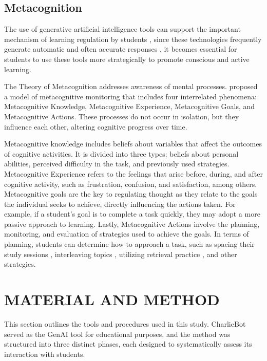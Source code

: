 \documentclass[a4paper,twoside]{article}
\begin{document}
\subsection{Metacognition}

The use of generative artificial intelligence tools can support the important
mechanism of learning regulation by students \citep{larsen18}, since these
technologies frequently generate automatic and often accurate responses
\cite{Puryear22}, it becomes essential for students to use these tools more
strategically to promote conscious and active learning.

The Theory of Metacognition addresses awareness of mental processes.
\cite{flavell79} proposed a model of metacognitive monitoring that includes four
interrelated phenomena: Metacognitive Knowledge, Metacognitive Experience,
 Metacognitive Goals, and Metacognitive Actions. These processes do not occur
in isolation, but they influence each other, altering cognitive progress over
time.

Metacognitive knowledge includes beliefs about variables that affect the
outcomes of cognitive activities. It is divided into three types: beliefs about
personal abilities, perceived difficulty in the task, and previously used
strategies. Metacognitive Experience refers to the feelings that arise
before, during, and after cognitive activity, such as frustration, confusion,
and satisfaction, among others. Metacognitive goals are the key to regulating
thought as they relate to the goals the individual seeks to achieve, directly
influencing the actions taken. For example, if a student’s goal is to complete
a task quickly, they may adopt a more passive approach to learning. Lastly,
Metacognitive Actions involve the planning, monitoring, and evaluation of
strategies used to achieve the goals. In terms of planning, students can
determine how to approach a task, such as spacing their study sessions
\citep{Ouhao18, Carvalho20}, interleaving topics \citep{Rivers21}, utilizing
retrieval practice \citep{larsen18}, and other strategies.

\section{\uppercase{Material and Method}}

This section outlines the tools and procedures used in this study. CharlieBot
served as the GenAI tool for educational purposes, and the method was structured
into three distinct phases, each designed to systematically assess its
interaction with students.
\end{document}
